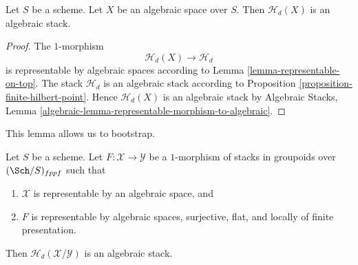 \begin{lemma}
\label{lemma-hilbert-stack-of-space}
Let $S$ be a scheme.
Let $X$ be an algebraic space over $S$.
Then $\mathcal{H}_d(X)$ is an algebraic stack.
\end{lemma}

\begin{proof}
The $1$-morphism
$$
\mathcal{H}_d(X) \longrightarrow \mathcal{H}_d
$$
is representable by algebraic spaces according to
Lemma \ref{lemma-representable-on-top}.
The stack $\mathcal{H}_d$ is an algebraic stack according to
Proposition \ref{proposition-finite-hilbert-point}.
Hence $\mathcal{H}_d(X)$ is an algebraic stack by
Algebraic Stacks,
Lemma \ref{algebraic-lemma-representable-morphism-to-algebraic}.
\end{proof}

\noindent
This lemma allows us to bootstrap.

\begin{lemma}
\label{lemma-hilbert-stack-relative-space}
Let $S$ be a scheme. Let $F : \mathcal{X} \to \mathcal{Y}$ be a $1$-morphism
of stacks in groupoids over $(\Sch/S)_{fppf}$ such that
\begin{enumerate}
\item $\mathcal{X}$ is representable by an algebraic space, and
\item $F$ is representable by algebraic spaces, surjective, flat, and
locally of finite presentation.
\end{enumerate}
Then $\mathcal{H}_d(\mathcal{X}/\mathcal{Y})$ is an algebraic stack.
\end{lemma}

